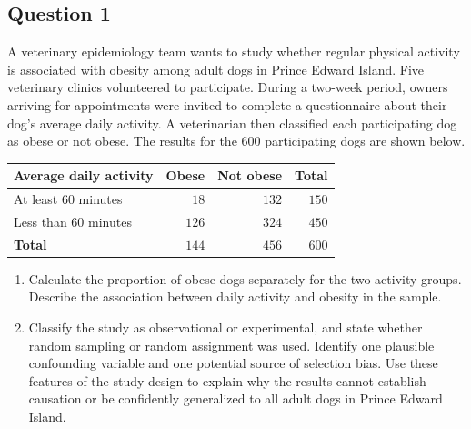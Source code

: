\documentclass[10pt,letterpaper]{article}
\begin{document}
\subsection*{Question 1}
A veterinary epidemiology team wants to study whether regular physical activity is associated with obesity among adult dogs in Prince Edward Island. Five veterinary clinics volunteered to participate. During a two-week period, owners arriving for appointments were invited to complete a questionnaire about their dog's average daily activity. A veterinarian then classified each participating dog as obese or not obese.
The results for the $600$ participating dogs are shown below.
\begin{center}
\begin{tabular}{lrrr}
\toprule
\textbf{Average daily activity} & \textbf{Obese} & \textbf{Not obese} & \textbf{Total} \\
\midrule
At least $60$ minutes & $18$ & $132$ & $150$ \\
Less than $60$ minutes & $126$ & $324$ & $450$ \\
\midrule
\textbf{Total} & $144$ & $456$ & $600$ \\
\bottomrule
\end{tabular}
\end{center}
\begin{enumerate}
	\item Calculate the proportion of obese dogs separately for the two activity groups. Describe the association between daily activity and obesity in the sample.
	\item Classify the study as observational or experimental, and state whether random sampling or random assignment was used. Identify one plausible confounding variable and one potential source of selection bias. Use these features of the study design to explain why the results cannot establish causation or be confidently generalized to all adult dogs in Prince Edward Island.
\end{enumerate}

\end{document}
